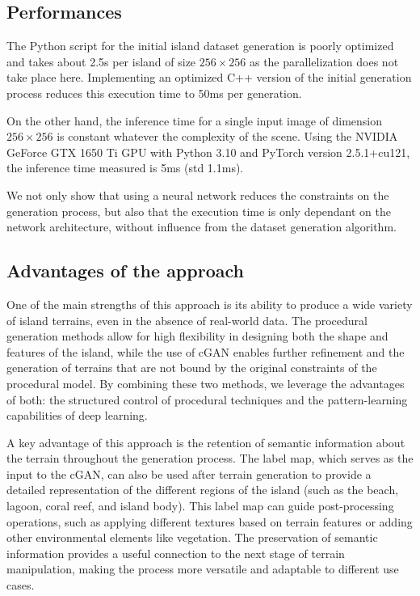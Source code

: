 \subsection{Performances}
\label{sec:coral-island_performances}

The Python script for the initial island dataset generation is poorly optimized and takes about 2.5s per island of size $256 \times 256$ as the parallelization does not take place here. Implementing an optimized C++ version of the initial generation process reduces this execution time to 50ms per generation.

On the other hand, the inference time for a single input image of dimension $256 \times 256$ is constant whatever the complexity of the scene. Using the NVIDIA GeForce GTX 1650 Ti GPU with Python 3.10 and PyTorch version 2.5.1+cu121, the inference time measured is 5ms (std 1.1ms). 

We not only show that using a neural network reduces the constraints on the generation process, but also that the execution time is only dependant on the network architecture, without influence from the dataset generation algorithm. 



\subsection{Advantages of the approach}
\label{sec:coral-island_advantages}

One of the main strengths of this approach is its ability to produce a wide variety of island terrains, even in the absence of real-world data. The procedural generation methods allow for high flexibility in designing both the shape and features of the island, while the use of cGAN enables further refinement and the generation of terrains that are not bound by the original constraints of the procedural model. By combining these two methods, we leverage the advantages of both: the structured control of procedural techniques and the pattern-learning capabilities of deep learning.

A key advantage of this approach is the retention of semantic information about the terrain throughout the generation process. The label map, which serves as the input to the cGAN, can also be used after terrain generation to provide a detailed representation of the different regions of the island (such as the beach, lagoon, coral reef, and island body). This label map can guide post-processing operations, such as applying different textures based on terrain features or adding other environmental elements like vegetation. The preservation of semantic information provides a useful connection to the next stage of terrain manipulation, making the process more versatile and adaptable to different use cases.

